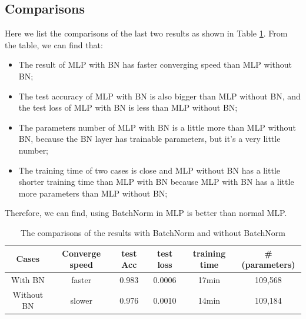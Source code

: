 \documentclass{elegantbook}
\begin{document}
\subsection{Comparisons}
Here we list the comparisons of the last two results as shown in Table \ref{tab1}. From the table, we can find that:
\begin{itemize}
	\item The result of MLP with BN has faster converging speed than MLP without BN;
	\item The test accuracy of MLP with BN is also bigger than MLP without BN, and the test loss of MLP with BN is less than MLP without BN;
	\item The parameters number of MLP with BN is a little more than MLP without BN, because the BN layer has trainable parameters, but it's a very little number;
	\item The training time of two cases is close and MLP without BN has a little shorter training time than MLP with BN because MLP with BN has a little more parameters than MLP without BN;
\end{itemize}
Therefore, we can find, using BatchNorm in MLP is better than normal MLP.
\begin{table}[!h]
	\centering
	\caption{\label{tab1}The comparisons of the results with BatchNorm and without BatchNorm}
	\begin{tabular}{|c|c|c|c|c|c|}
		\hline
		Cases & Converge speed & test Acc & test loss & training time & \#(parameters) \\
		\hline
		With BN & faster & 0.983 & 0.0006 & 17min & 109,568 \\
		\hline
		Without BN & slower & 0.976 & 0.0010 & 14min & 109,184 \\
		\hline
	\end{tabular}
\end{table}
\end{document}
